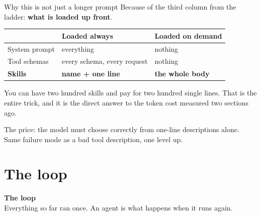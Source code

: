 \documentclass[aspectratio=169]{beamer}
\newcommand{\keybox}[1]{%
  \begin{tcolorbox}[colback=armblue!8, colframe=armblue, boxrule=0.6pt, arc=2pt]
  #1
  \end{tcolorbox}}
\newcommand{\watchbox}[1]{%
  \begin{tcolorbox}[colback=armorange!12, colframe=armorange, boxrule=0.6pt, arc=2pt]
  #1
  \end{tcolorbox}}
\newcommand{\sectiontransition}[2]{%
  \begin{frame}[plain]
    \vfill
    \begin{center}
      {\Huge\bfseries\color{popblue} #1}\\[1.1em]
      {\large #2}
    \end{center}
    \vfill
  \end{frame}}
\begin{document}
\begin{frame}{Why this is not just a longer prompt}
  \vspace{0.35em}
  Because of the third column from the ladder: \textbf{what is loaded up front}.

  \vspace{0.4em}
  \begin{center}
  \small
  \begin{tabular}{lll}
    \toprule
    & \textbf{Loaded always} & \textbf{Loaded on demand} \\
    \midrule
    System prompt & everything & nothing \\
    Tool schemas  & every schema, every request & nothing \\
    \textbf{Skills} & \textbf{name + one line} & \textbf{the whole body} \\
    \bottomrule
  \end{tabular}
  \end{center}

  \vspace{0.3em}
  \keybox{\small You can have two hundred skills and pay for two hundred single lines. That is
  the entire trick, and it is the direct answer to the token cost measured two sections ago.}

  \vspace{0.2em}
  \watchbox{\small The price: the model must choose correctly from one-line descriptions alone.
  Same failure mode as a bad tool description, one level up.}
\end{frame}

\section{The loop}
\sectiontransition{The loop}{Everything so far ran once. An agent is what happens when it runs
again.}
\end{document}
